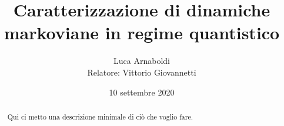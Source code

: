 \documentclass[a4paper]{article}
\title{Caratterizzazione di dinamiche markoviane in regime quantistico}
\author{Luca Arnaboldi \\
        {\small Relatore: Vittorio Giovannetti}}
\date{10 settembre 2020}
\begin{document}
\maketitle

\begin{abstract}
Qui ci metto una descrizione minimale di ciò che voglio fare.
\end{abstract}
\vspace{0.5em}


\end{document}
